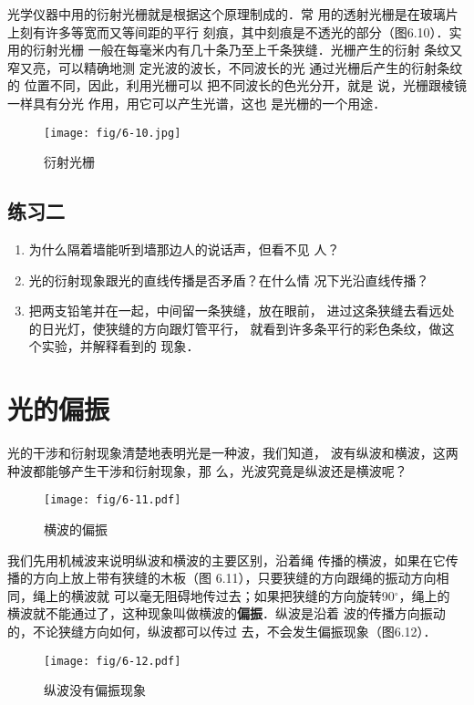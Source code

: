 光学仪器中用的衍射光栅就是根据这个原理制成的．常
用的透射光栅是在玻璃片上刻有许多等宽而又等间距的平行
刻痕，其中刻痕是不透光的部分（图6.10）．实用的衍射光栅
一般在每毫米内有几十条乃至上千条狭缝．光栅产生的衍射
条纹又窄又亮，可以精确地测
定光波的波长，不同波长的光
通过光栅后产生的衍射条纹的
位置不同，因此，利用光栅可以
把不同波长的色光分开，就是
说，光栅跟棱镜一样具有分光
作用，用它可以产生光谱，这也
是光栅的一个用途．

\begin{figure}[htp]\centering
    \texttt{[image: fig/6-10.jpg]}
    \caption{衍射光栅}
    \end{figure}

\subsection*{练习二}
\begin{enumerate}
\item 为什么隔着墙能听到墙那边人的说话声，但看不见
人？
\item 光的衍射现象跟光的直线传播是否矛盾？在什么情
况下光沿直线传播？
\item 把两支铅笔并在一起，中间留一条狭缝，放在眼前，
进过这条狭缝去看远处的日光灯，使狭缝的方向跟灯管平行，
就看到许多条平行的彩色条纹，做这个实验，并解释看到的
现象．
\end{enumerate}

\section{光的偏振}

光的干涉和衍射现象清楚地表明光是一种波，我们知道，
波有纵波和横波，这两种波都能够产生干涉和衍射现象，那
么，光波究竟是纵波还是横波呢？
\begin{figure}[htp]\centering
    \texttt{[image: fig/6-11.pdf]}
    \caption{横波的偏振}
    \end{figure}

我们先用机械波来说明纵波和横波的主要区别，沿着绳
传播的横波，如果在它传播的方向上放上带有狭缝的木板（图
6.11），只要狭缝的方向跟绳的振动方向相同，绳上的横波就
可以毫无阻碍地传过去；如果把狭缝的方向旋转90$^\circ$，绳上的
横波就不能通过了，这种现象叫做横波的\textbf{偏振}．纵波是沿着
波的传播方向振动的，不论狭缝方向如何，纵波都可以传过
去，不会发生偏振现象（图6.12）．
\begin{figure}[htp]\centering
    \texttt{[image: fig/6-12.pdf]}
    \caption{纵波没有偏振现象}
    \end{figure}

